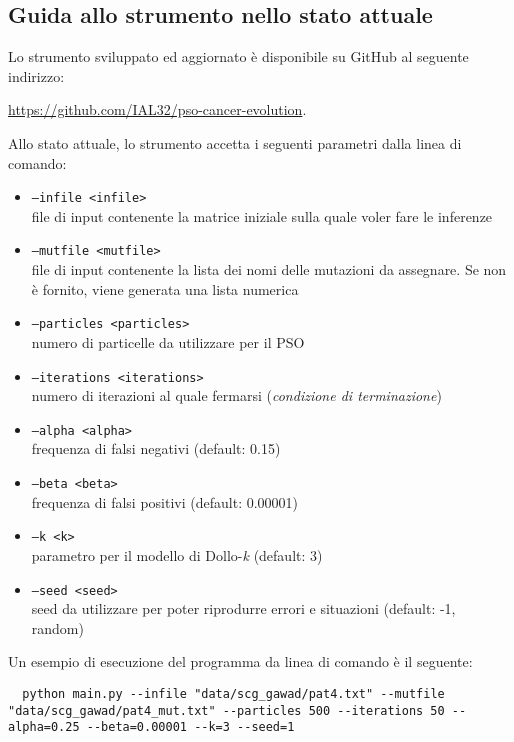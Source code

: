 \subsection{Guida allo strumento nello stato attuale}
\label{chap:pso-extra-guide}
Lo strumento sviluppato ed aggiornato è disponibile su GitHub al seguente indirizzo:

\begin{center}
  \href{https://github.com/IAL32/pso-cancer-evolution}{https://github.com/IAL32/pso-cancer-evolution}.
\end{center}

Allo stato attuale, lo strumento accetta i seguenti parametri dalla linea di comando: \begin{itemize}
  \item \texttt{--infile <infile>} \\ file di input contenente la matrice iniziale sulla quale voler fare le inferenze
  \item \texttt{--mutfile <mutfile>} \\ file di input contenente la lista dei nomi delle mutazioni da assegnare. Se non è fornito, viene generata una lista numerica
  \item \texttt{--particles <particles>} \\ numero di particelle da utilizzare per il PSO
  \item \texttt{--iterations <iterations>} \\ numero di iterazioni al quale fermarsi (\textit{condizione di terminazione})
  \item \texttt{--alpha <alpha>} \\ frequenza di falsi negativi (default: 0.15)
  \item \texttt{--beta <beta>} \\ frequenza di falsi positivi (default: 0.00001)
  \item \texttt{--k <k>} \\ parametro per il modello di Dollo-\textit{k} (default: 3)
  \item \texttt{--seed <seed>} \\ seed da utilizzare per poter riprodurre errori e situazioni (default: -1, random)
\end{itemize}

Un esempio di esecuzione del programma da linea di comando è il seguente:

\begin{lstlisting}
  python main.py --infile "data/scg_gawad/pat4.txt" --mutfile "data/scg_gawad/pat4_mut.txt" --particles 500 --iterations 50 --alpha=0.25 --beta=0.00001 --k=3 --seed=1
\end{lstlisting}


